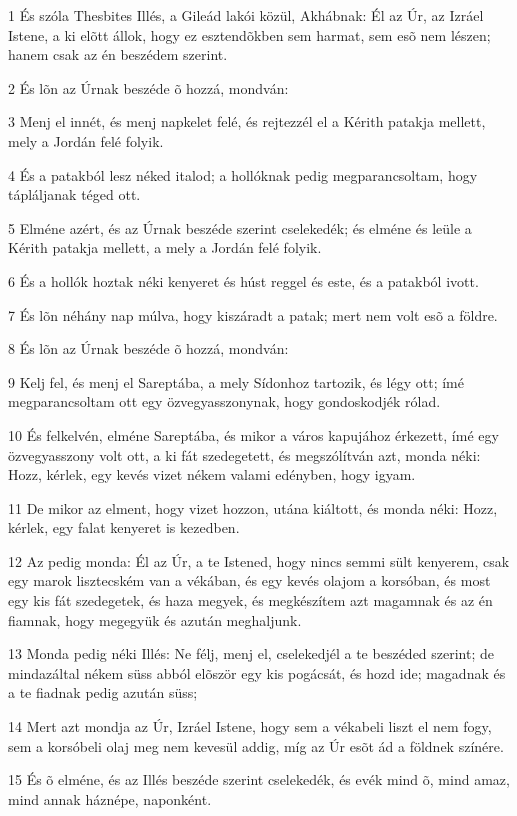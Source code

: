 \par 1 És szóla Thesbites Illés, a Gileád lakói közül, Akhábnak: Él az Úr, az Izráel Istene, a ki elõtt állok, hogy ez esztendõkben sem harmat, sem esõ nem lészen; hanem csak az én beszédem szerint.
\par 2 És lõn az Úrnak beszéde õ hozzá, mondván:
\par 3 Menj el innét, és menj napkelet felé, és rejtezzél el a Kérith patakja mellett, mely a Jordán felé folyik.
\par 4 És a patakból lesz néked italod; a hollóknak pedig megparancsoltam, hogy tápláljanak téged ott.
\par 5 Elméne azért, és az Úrnak beszéde szerint cselekedék; és elméne és leüle a Kérith patakja mellett, a mely a Jordán felé folyik.
\par 6 És a hollók hoztak néki kenyeret és húst reggel és este, és a patakból ivott.
\par 7 És lõn néhány nap múlva, hogy kiszáradt a patak; mert nem volt esõ a földre.
\par 8 És lõn az Úrnak beszéde õ hozzá, mondván:
\par 9 Kelj fel, és menj el Sareptába, a mely Sídonhoz tartozik, és légy ott; ímé megparancsoltam ott egy özvegyasszonynak, hogy gondoskodjék rólad.
\par 10 És felkelvén, elméne Sareptába, és mikor a város kapujához érkezett, ímé egy özvegyasszony volt ott, a ki fát szedegetett, és megszólítván azt, monda néki: Hozz, kérlek, egy kevés vizet nékem valami edényben, hogy igyam.
\par 11 De mikor az elment, hogy vizet hozzon, utána kiáltott, és monda néki: Hozz, kérlek, egy falat kenyeret is kezedben.
\par 12 Az pedig monda: Él az Úr, a te Istened, hogy nincs semmi sült kenyerem, csak egy marok lisztecském van a vékában, és egy kevés olajom a korsóban, és most egy kis fát szedegetek, és haza megyek, és megkészítem azt magamnak és az én fiamnak, hogy megegyük és azután meghaljunk.
\par 13 Monda pedig néki Illés: Ne félj, menj el, cselekedjél a te beszéded szerint; de mindazáltal nékem süss abból elõször egy kis pogácsát, és hozd ide; magadnak és a te fiadnak pedig azután süss;
\par 14 Mert azt mondja az Úr, Izráel Istene, hogy sem a vékabeli liszt el nem fogy, sem a korsóbeli olaj meg nem kevesül addig, míg az Úr esõt ád a földnek színére.
\par 15 És õ elméne, és az Illés beszéde szerint cselekedék, és evék mind õ, mind amaz, mind annak háznépe, naponként.

